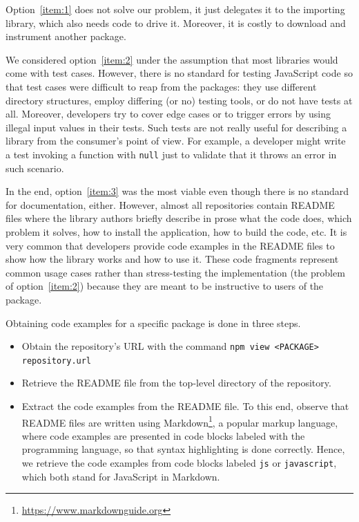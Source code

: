 \documentclass[english,cleveref,autoref,submission]{programming}
\begin{document}
Option~\ref{item:1} does not solve our problem, it just delegates it
to the importing library, which also needs code to drive it. Moreover,
it is costly to download and instrument another package.

We considered option~\ref{item:2} under the assumption that most
libraries would come with test cases. However, there is no standard
for testing JavaScript code so that test cases were difficult to reap
from the \NPM{} packages: they use different directory structures,
employ differing (or no) testing tools, or do not have tests
at all. Moreover, developers try to cover edge cases or to trigger errors by using illegal
input values in their tests. Such tests are not really useful for describing a library
from the consumer's point of view. For example, a developer might write a test invoking a
function with \texttt{null} just to validate that it throws an error in such scenario. 

In the end, option~\ref{item:3} was the most viable even though there
is no standard for documentation, either. However, almost all repositories
contain README files where the library authors briefly describe in prose what
the code does, which problem it solves, how to install the
application, how to build the code, etc. It is very common that
developers provide code examples in the README files to show how the
library works and how to use it. These code fragments represent common usage cases rather
than stress-testing the implementation (the problem of
option~\ref{item:2}) because they are meant to be instructive to users of the package.  


Obtaining code examples for a specific \NPM{} package is done in three steps.
\begin{itemize}
\item Obtain the  repository's URL with the command
  \texttt{npm view <PACKAGE> repository.url}

\item Retrieve the README file from the top-level directory of the repository.

\item Extract the code examples from the README file. To this end,
  observe that README files are
  written using Markdown\footnote{\url{https://www.markdownguide.org}}, a
  popular markup language, where
  code examples are presented in code blocks labeled with the programming
  language, so that syntax highlighting is done correctly. Hence, we
  retrieve the code examples from code blocks labeled \texttt{js} or
  \texttt{javascript}, which both stand for JavaScript in
  Markdown.
\end{itemize}
\end{document}
